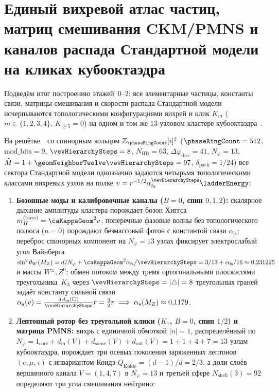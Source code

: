 \section{Единый вихревой атлас частиц, матриц смешивания CKM/PMNS и каналов распада Стандартной модели на кликах кубооктаэдра}
\label{sec:floor2-sm-vortex-atlas}

Подведём итог построению этажей~$0\text{--}2$: все элементарные частицы, константы связи, матрицы смешивания и скорости распада Стандартной модели исчерпываются топологическими конфигурациями вихрей и клик $K_m$ ($m\in\{1,2,3,4\}$, $K_{\ge 5}=0$) на одном и том же 13-узловом кластере кубооктаэдра~\latGCKshort.

\begin{theorem}
\label{thm:floor2-sm-vortex-clique-atlas}
На решётке~\latGCKshort\ со спинорным кольцом $\mathbb{Z}_{\phaseRingCount}[i]^2$ ($\phaseRingCount=512$, $\mathrm{mod\_bits}=9$, $\vevHierarchySteps=8$, $N_{\mathrm{HB}}=63$, $\Delta\varphi_{\mathrm{disc}}=41$, $N_\varphi=13$, $\hat M = 1+\geomNeighborTwelve\vevHierarchySteps = 97$, $\delta_{\mathrm{pack}}=1/24$) все сектора Стандартной модели однозначно задаются четырьмя топологическими классами вихревых узлов на полке $v = r^{-1/2}\alpha_{\mathrm{fs}}^{\vevHierarchySteps}\ladderEnergy$:
\begin{enumerate}[leftmargin=*]
\item \textbf{Бозонные моды и калибровочные каналы ($B=0$, спин $0,1,2$):}
  скалярное дыхание амплитуды кластера порождает бозон Хиггса $m_H^{(\mathrm{bare})} = \caKappaGeom^2 v$;
  поперечные фазовые волны без топологического полюса ($n=0$) порождают безмассовый фотон с константой связи $\alpha_{\mathrm{fs}}$;
  переброс спинорных компонент на $N_\varphi=13$ узлах фиксирует электрослабый угол Вайнберга $\sin^2\theta_W(M_Z) = d/N_\varphi + \caKappaGeom^2\alpha_{\mathrm{fs}}/\vevHierarchySteps = 3/13 + \alpha_{\mathrm{fs}}/16 \approx 0{,}231225$ и массы $W^\pm,Z^0$;
  обмен потоком между тремя ортогональными плоскостями треугольника~$K_3$ через $\vevHierarchySteps = |\triangle| = 8$ треугольных граней задаёт константу сильной связи $\alpha_s(v) = \frac{d\,d_{\mathrm{in}}(\square)}{\vevHierarchySteps}r = \frac{3}{2}r \implies \alpha_s(M_Z)\approx 0{,}1179$.
\item \textbf{Лептонный ротор без треугольной клики ($K_1$, $B=0$, спин $1/2$) и матрица PMNS:}
  вихрь с единичной обмоткой $|n|=1$, распределённый по $N_\varphi = 1_{\mathrm{core}} + d_{\mathrm{in}}(V) + d_{\mathrm{same}}(V) + d_{\mathrm{out}}(V) = 1+1+4+7 = 13$ узлам кубооктаэдра, порождает три осевых поколения заряженных лептонов $(e,\mu,\tau)$ с инвариантом Коидэ $Q_{\mathrm{Koide}} = (d-1)/d = 2/3$, а доли слоёв вершинного канала $V=(1,4,7)$ в $N_\varphi=13$ и третьей сфере $N_{\mathrm{shell}}(3)=92$ определяют три угла смешивания нейтрино:

\end{enumerate}
\end{theorem}
